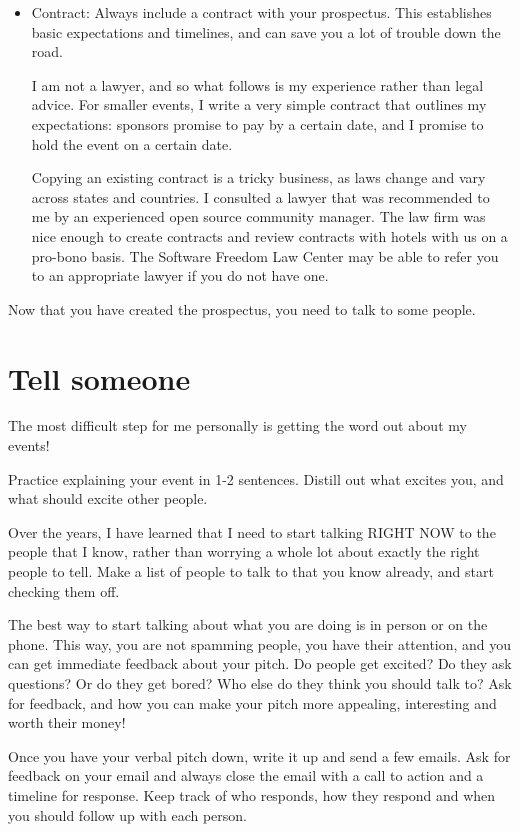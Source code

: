 \begin{itemize}
\item Contract:
Always include a contract with your prospectus. This establishes basic
expectations and timelines, and can save you a lot of trouble down the road.

I am not a lawyer, and so what follows is my experience rather than legal
advice. For smaller events, I write a very simple contract that outlines my
expectations: sponsors promise to pay by a certain date, and I promise to hold
the event on a certain date.

Copying an existing contract is a tricky business, as laws change and vary
across states and countries. I consulted a lawyer that was recommended to me by
an experienced open source community manager. The law firm was nice enough to
create contracts and review contracts with hotels with us on a pro-bono basis.
The Software Freedom Law Center may be able to refer you to an appropriate
lawyer if you do not have one.
\end{itemize}

Now that you have created the prospectus, you need to talk to some people.

\section*{Tell someone}
The most difficult step for me personally is getting the word out about my
events! 

Practice explaining your event in 1-2 sentences. Distill out what excites you,
and what should excite other people.

Over the years, I have learned that I need to start talking RIGHT NOW to the
people that I know, rather than worrying a whole lot about exactly the right
people to tell.  Make a list of people to talk to that you know already, and
start checking them off.

The best way to start talking about what you are doing is in person or on the
phone. This way, you are not spamming people, you have their attention, and you
can get immediate feedback about your pitch. Do people get excited? Do they ask
questions? Or do they get bored? Who else do they think you should talk to? Ask
for feedback, and how you can make your pitch more appealing, interesting and
worth their money!

Once you have your verbal pitch down, write it up and send a few emails. Ask for
feedback on your email and always close the email with a call to action and a
timeline for response.  Keep track of who responds, how they respond and when
you should follow up with each person.


